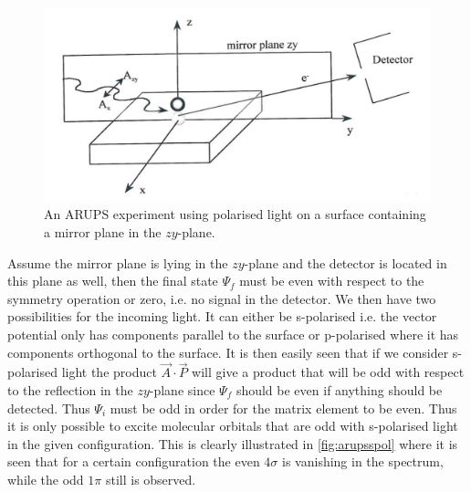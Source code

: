 \begin{figure}[h!]
	\begin{center}
	\includegraphics[scale=3.5]{figures/05_07.png}
	\caption{ An ARUPS experiment using polarised light on a surface containing a mirror plane in the $zy$-plane.}
	\label{fig:arupspol}
	\end{center}
\end{figure}

Assume the mirror plane is lying in the $zy$-plane and the detector is located in this plane as well, then the final state  $\Psi_f$ must be even with respect to the symmetry operation or zero, i.e. no signal in the detector. We then have two possibilities for the incoming light. It can either be s-polarised i.e. the vector potential only has components parallel to the surface or p-polarised where it has components orthogonal to the surface. It is then easily seen that if we consider s-polarised light the product $\vec{A}\cdot \vec{P}$ will give a product that will be odd with respect to the reflection in the $zy$-plane since $\Psi_f$ should be even if anything should be detected. Thus $\Psi_i$ must be odd in order for the matrix element to be even. Thus it is only possible to excite molecular orbitals that are odd with s-polarised light in the given configuration. This is clearly illustrated in \autoref{fig:arupsspol} where it is seen that for a certain configuration the even $4\sigma$ is vanishing in the spectrum, while the odd $1\pi$ still is observed.

